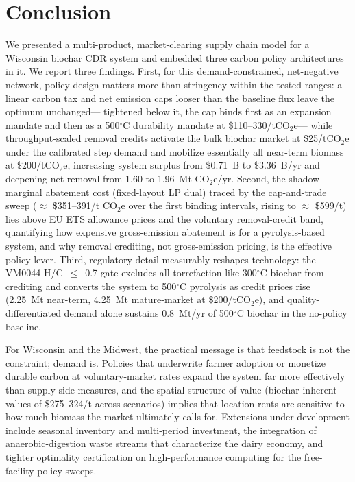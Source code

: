 
\section{Conclusion}
\label{sec:conclusion}

We presented a multi-product, market-clearing supply chain model for a
Wisconsin biochar CDR system and embedded three carbon policy architectures in
it. We report three findings. First, for this demand-constrained, net-negative
network, policy design matters more than stringency within the tested ranges:
a linear carbon tax and net
emission caps looser than the baseline flux leave the optimum unchanged---
tightened below it, the cap binds first as an expansion mandate and then as a
500$^\circ$C durability mandate at \$110--330/tCO$_2$e---
while throughput-scaled removal credits activate the bulk
biochar market at \$25/tCO$_2$e under the calibrated step demand and mobilize
essentially all near-term biomass
at \$200/tCO$_2$e, increasing system surplus from \$0.71~B to \$3.36~B/yr and
deepening net removal from 1.60 to 1.96~Mt CO$_2$e/yr. Second, the shadow
marginal abatement cost (fixed-layout LP dual) traced by the cap-and-trade
sweep ($\approx$ \$351--391/t CO$_2$e
over the first binding intervals, rising to $\approx$ \$599/t) lies above
EU ETS allowance prices and the voluntary removal-credit band, quantifying how
expensive gross-emission abatement is for a pyrolysis-based system, and why
removal crediting, not gross-emission pricing, is the effective policy lever.
Third, regulatory detail measurably reshapes
technology: the VM0044 H/C~$\le$~0.7 gate excludes all torrefaction-like
300$^\circ$C biochar from crediting and converts the system to 500$^\circ$C
pyrolysis as credit prices rise (2.25~Mt near-term, 4.25~Mt mature-market at
\$200/tCO$_2$e), and
quality-differentiated demand alone sustains 0.8~Mt/yr of 500$^\circ$C biochar
in the no-policy baseline.

For Wisconsin and the Midwest, the practical message is that feedstock is not
the constraint; demand is. Policies that underwrite farmer adoption or
monetize durable carbon at voluntary-market rates expand the system far more
effectively than supply-side measures, and the spatial structure of value
(biochar inherent values of \$275--324/t across scenarios) implies that
location rents are sensitive to how much biomass the market ultimately calls
for. Extensions under development include seasonal inventory and multi-period
investment, the integration of anaerobic-digestion waste streams that
characterize the dairy economy, and tighter optimality certification on
high-performance computing for the free-facility policy sweeps.
